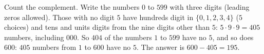 Count the complement. Write the numbers $0$ to $599$ with three digits (leading zeros allowed). Those with no digit $5$ have hundreds digit in $\{0,1,2,3,4\}$ ($5$ choices) and tens and units digits from the nine digits other than $5$: $5\cdot9\cdot9=405$ numbers, including $000$. So $404$ of the numbers $1$ to $599$ have no $5$, and so does $600$: $405$ numbers from $1$ to $600$ have no $5$. The answer is $600-405=\boxed{195}$.
